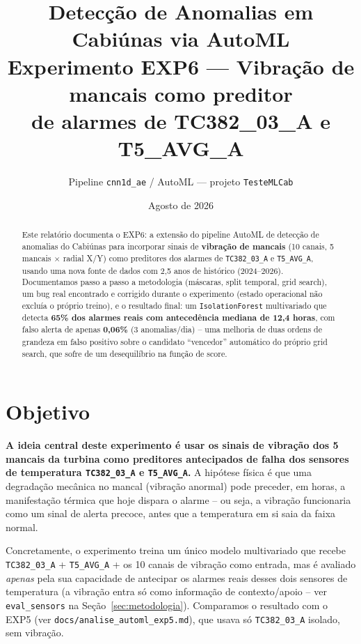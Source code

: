 \documentclass[11pt,a4paper]{article}
\title{Detecção de Anomalias em Cabiúnas via AutoML\\
\large Experimento EXP6 --- Vibração de mancais como preditor\\
de alarmes de TC382\_03\_A e T5\_AVG\_A}
\author{Pipeline \texttt{cnn1d\_ae} / AutoML --- projeto \texttt{TesteMLCab}}
\date{Agosto de 2026}
\begin{document}
\maketitle

\begin{abstract}
Este relatório documenta o EXP6: a extensão do pipeline AutoML de detecção
de anomalias do Cabiúnas para incorporar sinais de \textbf{vibração de
mancais} (10 canais, 5 mancais $\times$ radial X/Y) como preditores dos
alarmes de \texttt{TC382\_03\_A} e \texttt{T5\_AVG\_A}, usando uma nova
fonte de dados com 2,5 anos de histórico (2024--2026). Documentamos passo a
passo a metodologia (máscaras, split temporal, grid search), um bug real
encontrado e corrigido durante o experimento (estado operacional não
excluía o próprio treino), e o resultado final: um \texttt{IsolationForest}
multivariado que detecta \textbf{65\% dos alarmes reais com antecedência
mediana de 12,4 horas}, com falso alerta de apenas \textbf{0,06\%}
(3 anomalias/dia) -- uma melhoria de duas ordens de grandeza em falso
positivo sobre o candidato ``vencedor'' automático do próprio grid search,
que sofre de um desequilíbrio na função de score.
\end{abstract}

\tableofcontents

\section{Objetivo}

\textbf{A ideia central deste experimento é usar os sinais de vibração dos
5 mancais da turbina como preditores antecipados de falha dos sensores de
temperatura \texttt{TC382\_03\_A} e \texttt{T5\_AVG\_A}.} A hipótese física
é que uma degradação mecânica no mancal (vibração anormal) pode preceder,
em horas, a manifestação térmica que hoje dispara o alarme -- ou seja, a
vibração funcionaria como um sinal de alerta precoce, antes que a
temperatura em si saia da faixa normal.

Concretamente, o experimento treina um único modelo multivariado que
recebe \texttt{TC382\_03\_A} + \texttt{T5\_AVG\_A} + os 10 canais de
vibração como entrada, mas é avaliado \emph{apenas} pela sua capacidade de
antecipar os alarmes reais desses dois sensores de temperatura (a vibração
entra só como informação de contexto/apoio -- ver \texttt{eval\_sensors} na
Seção~\ref{sec:metodologia}). Comparamos o resultado com o EXP5 (ver
\texttt{docs/analise\_automl\_exp5.md}), que usava só
\texttt{TC382\_03\_A} isolado, sem vibração.
\end{document}
